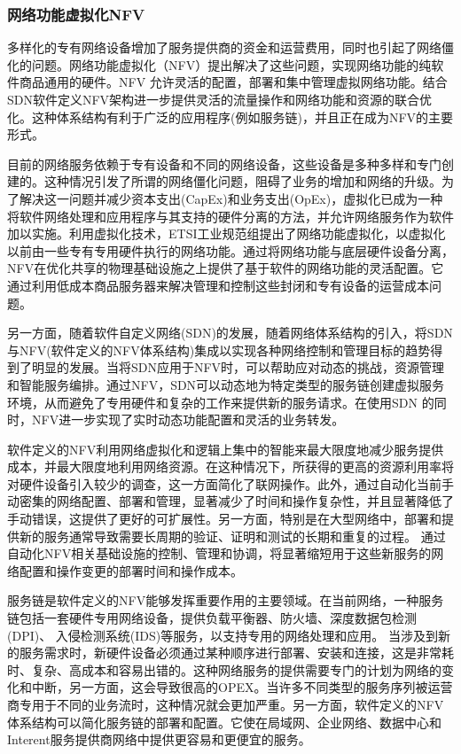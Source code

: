 \subsubsection{网络功能虚拟化NFV}
多样化的专有网络设备增加了服务提供商的资金和运营费用，同时也引起了网络僵化的问题。网络功能虚拟化（NFV）提出解决了这些问题，实现网络功能的纯软件商品通用的硬件。NFV 允许灵活的配置，部署和集中管理虚拟网络功能。结合SDN软件定义NFV架构进一步提供灵活的流量操作和网络功能和资源的联合优化。这种体系结构有利于广泛的应用程序(例如服务链)，并且正在成为NFV的主要形式。

目前的网络服务依赖于专有设备和不同的网络设备，这些设备是多种多样和专门创建的\cite{sherry2012making,wang2011untold,walfish2004middleboxes}。这种情况引发了所谓的网络僵化问题，阻碍了业务的增加和网络的升级。为了解决这一问题并减少资本支出(CapEx)和业务支出(OpEx)，虚拟化已成为一种将软件网络处理和应用程序与其支持的硬件分离的方法，并允许网络服务作为软件\cite{schaffrath2009network,chowdhury2010survey,chowdhury2009network} 加以实施。利用虚拟化技术，ETSI工业规范组提出了网络功能虚拟化，以虚拟化以前由一些专有专用硬件执行的网络功能\cite{chiosi2012network,yue2013network}。通过将网络功能与底层硬件设备分离，NFV在优化共享的物理基础设施之上提供了基于软件的网络功能的灵活配置。它通过利用低成本商品服务器来解决管理和控制这些封闭和专有设备的运营成本问题。

另一方面，随着软件自定义网络(SDN)的发展，随着网络体系结构\cite{manzalini2014software,yeganeh2013scalability,ge20145g}的引入，将SDN与NFV(软件定义的NFV体系结构)集成以实现各种网络控制和管理目标的趋势得到了明显的发展。当将SDN应用于NFV时，可以帮助应对动态的挑战，资源管理和智能服务编排。通过NFV，SDN可以动态地为特定类型的服务链创建虚拟服务环境，从而避免了专用硬件和复杂的工作来提供新的服务请求。在使用SDN 的同时，NFV进一步实现了实时动态功能配置和灵活的业务转发。

软件定义的NFV利用网络虚拟化和逻辑上集中的智能来最大限度地减少服务提供成本，并最大限度地利用网络资源。在这种情况下，所获得的更高的资源利用率将对硬件设备引入较少的调查，这一方面简化了联网操作。此外，通过自动化当前手动密集的网络配置、部署和管理，显著减少了时间和操作复杂性，并且显著降低了手动错误，这提供了更好的可扩展性。另一方面，特别是在大型网络中，部署和提供新的服务通常导致需要长周期的验证、证明和测试的长期和重复的过程。
通过自动化NFV相关基础设施的控制、管理和协调，将显著缩短用于这些新服务的网络配置和操作变更的部署时间和操作成本。

服务链是软件定义的NFV能够发挥重要作用的主要领域\cite{friis2009service,lemmens2007enhancing}。在当前网络，一种服务链包括一套硬件专用网络设备，提供负载平衡器、防火墙、深度数据包检测(DPI)、 入侵检测系统(IDS)等服务，以支持专用的网络处理和应用\cite{greenberg2005clean,tschudin2001selnet,joseph2008policy,santos2008bridging}。 当涉及到新的服务需求时，新硬件设备必须通过某种顺序进行部署、安装和连接，这是非常耗时、复杂、高成本和容易出错的。这种网络服务的提供需要专门的计划为网络的变化和中断，另一方面，这会导致很高的OPEX。当许多不同类型的服务序列被运营商专用于不同的业务流时，这种情况就会更加严重。另一方面，软件定义的NFV 体系结构可以简化服务链的部署和配置。它使在局域网、企业网络、数据中心和Interent服务提供商网络中提供更容易和更便宜的服务。


